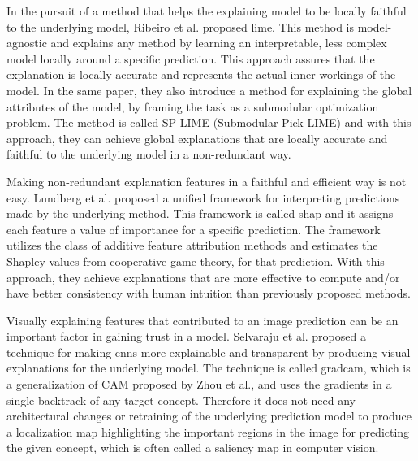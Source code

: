 


In the pursuit of a method that helps the explaining model to be locally faithful to the underlying model, Ribeiro et al.\cite{ribeiroWhyShouldTrust2016} proposed \gls{lime}. This method is model-agnostic and explains any method by learning an interpretable, less complex model locally around a specific prediction. This approach assures that the explanation is locally accurate and represents the actual inner workings of the model. 
In the same paper, they also introduce a method for explaining the global attributes of the model, by framing the task as a submodular optimization problem. The method is called SP-LIME (Submodular Pick LIME) and with this approach, they can achieve global explanations that are locally accurate and faithful to the underlying model in a non-redundant way.

Making non-redundant explanation features in a faithful and efficient way is not easy. Lundberg et al.\cite{lundbergUnifiedApproachInterpreting2017} proposed a unified framework for interpreting predictions made by the underlying method. This framework is called \gls{shap} and it assigns each feature a value of importance for a specific prediction. The framework utilizes the class of additive feature attribution methods and estimates the Shapley %
values from cooperative game theory, for that prediction. With this approach, they achieve explanations that are more effective to compute and/or have better consistency with human intuition than previously proposed methods.  


Visually explaining features that contributed to an image prediction can be an important factor in gaining trust in a model. Selvaraju et al.\cite{selvarajuGradCAMVisualExplanations2020} proposed a technique for making \glspl{cnn} more explainable and transparent by producing visual explanations for the underlying model. The technique is called \gls{gradcam}, which is a generalization of CAM proposed by Zhou et al.\cite{zhouLearningDeepFeatures2016}, and uses the gradients in a single backtrack of any target concept. Therefore it does not need any architectural changes or retraining of the underlying prediction model to produce a localization map highlighting the important regions in the image for predicting the given concept, which is often called a saliency map in computer vision.



